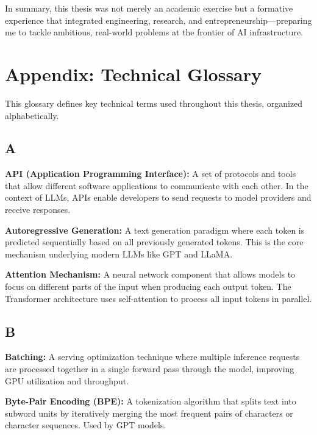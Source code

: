 \documentclass[english]{article}
\begin{document}
In summary, this thesis was not merely an academic exercise but a formative experience that integrated engineering, research, and entrepreneurship—preparing me to tackle ambitious, real-world problems at the frontier of AI infrastructure.


\newpage
\section*{Appendix: Technical Glossary}

This glossary defines key technical terms used throughout this thesis, organized alphabetically.

\subsection*{A}

\textbf{API (Application Programming Interface):} A set of protocols and tools that allow different software applications to communicate with each other. In the context of LLMs, APIs enable developers to send requests to model providers and receive responses.

\textbf{Autoregressive Generation:} A text generation paradigm where each token is predicted sequentially based on all previously generated tokens. This is the core mechanism underlying modern LLMs like GPT and LLaMA.

\textbf{Attention Mechanism:} A neural network component that allows models to focus on different parts of the input when producing each output token. The Transformer architecture uses self-attention to process all input tokens in parallel.

\subsection*{B}

\textbf{Batching:} A serving optimization technique where multiple inference requests are processed together in a single forward pass through the model, improving GPU utilization and throughput.

\textbf{Byte-Pair Encoding (BPE):} A tokenization algorithm that splits text into subword units by iteratively merging the most frequent pairs of characters or character sequences. Used by GPT models.
\end{document}
